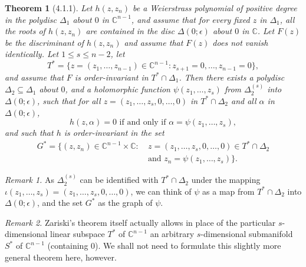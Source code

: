 \documentclass[11pt]{article}
\theoremstyle{plain}
\newtheorem*{theorem*}{Theorem}
\theoremstyle{definition}
\newcommand{\C}{\mathbb{C}}
\begin{document}
\begin{theorem*}[4.1.1]
Let $h(z, z_n)$ be a Weierstrass polynomial of positive degree in the
polydisc $\Delta_1$ about $0$ in $\C^{n-1}$, and assume that for every
fixed $z$ in $\Delta_1$, all the roots of $h(z, z_n)$ are contained in
the disc $\Delta(0; \epsilon)$ about $0$ in $\C$. Let $F(z)$ be the
discriminant of $h(z, z_n)$ and assume that $F(z)$ does not vanish
identically. Let $1 \le s \le n-2$, let
\[
T^* = \{ z = (z_1, \ldots, z_{n-1}) \in \C^{n-1} :
z_{s+1} = 0, \ldots, z_{n-1} = 0 \},
\]
and assume that $F$ is order-invariant in $T^* \cap \Delta_1$. Then
there exists a polydisc $\Delta_2 \subseteq \Delta_1$ about $0$, and
a holomorphic function $\psi(z_1, \ldots, z_s)$ from $\Delta_2^{(s)}$
into $\Delta(0; \epsilon)$, such that for all
$z = (z_1, \ldots, z_s, 0, \ldots, 0)$ in $T^* \cap \Delta_2$ and all
$\alpha$ in $\Delta(0; \epsilon)$,
\[
h(z, \alpha) = 0 \text{ if and only if } \alpha = \psi(z_1, \ldots, z_s),
\]
and such that $h$ is order-invariant in the set
\[
\begin{aligned}
G^* = \{ (z, z_n) \in \C^{n-1} \times \C :\
&z = (z_1, \ldots, z_s, 0, \ldots, 0) \in T^* \cap \Delta_2 \\
&\text{and } z_n = \psi(z_1, \ldots, z_s) \}.
\end{aligned}
\]
\end{theorem*}

\textit{Remark 1.} As $\Delta_2^{(s)}$ can be identified with
$T^* \cap \Delta_2$ under the mapping
$\iota(z_1, \ldots, z_s) = (z_1, \ldots, z_s, 0, \ldots, 0)$, we can
think of $\psi$ as a map from $T^* \cap \Delta_2$ into
$\Delta(0; \epsilon)$, and the set $G^*$ as the graph of $\psi$.

\textit{Remark 2.} Zariski's theorem itself actually allows in place
of the particular $s$-dimensional linear subspace $T^*$ of $\C^{n-1}$
an arbitrary $s$-dimensional submanifold $S^*$ of $\C^{n-1}$
(containing $0$). We shall not need to formulate this slightly more
general theorem here, however.
\end{document}
